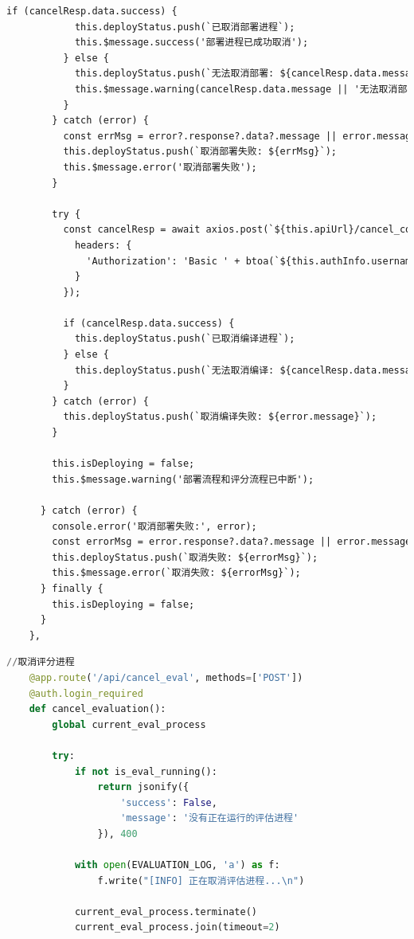 \documentclass[AutoFakeBold,AutoFakeSlant,language=chinese,degree=bachelor]{sustechthesis}
\begin{document}
\begin{itemize}
\begin{lstlisting}[language=HTML]
          if (cancelResp.data.success) {
            this.deployStatus.push(`已取消部署进程`);
            this.$message.success('部署进程已成功取消');
          } else {
            this.deployStatus.push(`无法取消部署: ${cancelResp.data.message}`);
            this.$message.warning(cancelResp.data.message || '无法取消部署进程');
          }
        } catch (error) {
          const errMsg = error?.response?.data?.message || error.message;
          this.deployStatus.push(`取消部署失败: ${errMsg}`);
          this.$message.error('取消部署失败');
        }

        try {
          const cancelResp = await axios.post(`${this.apiUrl}/cancel_compile`, {}, {
            headers: {
              'Authorization': 'Basic ' + btoa(`${this.authInfo.username}:${this.authInfo.password}`)
            }
          });

          if (cancelResp.data.success) {
            this.deployStatus.push(`已取消编译进程`);
          } else {
            this.deployStatus.push(`无法取消编译: ${cancelResp.data.message}`);
          }
        } catch (error) {
          this.deployStatus.push(`取消编译失败: ${error.message}`);
        }

        this.isDeploying = false;
        this.$message.warning('部署流程和评分流程已中断');

      } catch (error) {
        console.error('取消部署失败:', error);
        const errorMsg = error.response?.data?.message || error.message;
        this.deployStatus.push(`取消失败: ${errorMsg}`);
        this.$message.error(`取消失败: ${errorMsg}`);
      } finally {
        this.isDeploying = false;
      }
    },
    \end{lstlisting}
    \begin{lstlisting}[language=python]
    //取消评分进程
    @app.route('/api/cancel_eval', methods=['POST'])
    @auth.login_required
    def cancel_evaluation():
        global current_eval_process
        
        try:
            if not is_eval_running():
                return jsonify({
                    'success': False,
                    'message': '没有正在运行的评估进程'
                }), 400
            
            with open(EVALUATION_LOG, 'a') as f:
                f.write("[INFO] 正在取消评估进程...\n")
            
            current_eval_process.terminate()
            current_eval_process.join(timeout=2)
            

\end{lstlisting}
\end{itemize}
\end{document}
